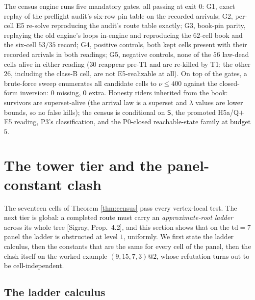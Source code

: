 \documentclass[11pt]{article}
\theoremstyle{definition}
\theoremstyle{remark}
\begin{document}
The census engine runs five mandatory gates, all passing at exit 0: G1, exact replay of the preflight audit's six-row pin table on the recorded arrivals; G2, per-cell E5 re-solve reproducing the audit's route table exactly; G3, book-pin parity, replaying the old engine's loops in-engine and reproducing the $62$-cell book and the six-cell $53/35$ record; G4, positive controls, both kept cells present with their recorded arrivals in both readings; G5, negative controls, none of the $56$ law-dead cells alive in either reading ($30$ reappear pre-T1 and are re-killed by T1; the other $26$, including the class-B cell, are not E5-realizable at all). On top of the gates, a brute-force sweep enumerates all candidate cells to $\nu\leq400$ against the closed-form inversion: $0$ missing, $0$ extra. Honesty riders inherited from the book: survivors are superset-alive (the arrival law is a superset and $\lambda$ values are lower bounds, so no false kills); the census is conditional on $\mathsf{S}$, the promoted H5a/Q$+$E5 reading, P3's classification, and the P0-closed reachable-state family at budget $5$.

\section{The tower tier and the panel-constant clash}\label{sec:tower}

The seventeen cells of Theorem \ref{thm:census} pass every vertex-local test. The next tier is global: a completed route must carry an \emph{approximate-root ladder} across its whole tree [Sigray, Prop.~4.2], and this section shows that on the $\mathrm{td}=7$ panel the ladder is obstructed at level $1$, uniformly. We first state the ladder calculus, then the constants that are the same for every cell of the panel, then the clash itself on the worked example $(9,15,7,3)@2$, whose refutation turns out to be cell-independent.

\subsection{The ladder calculus}\label{sec:ladder}
\end{document}
